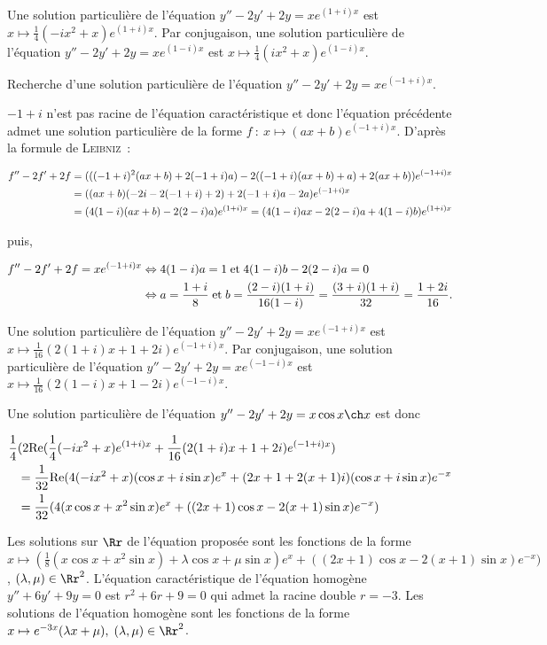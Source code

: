 {{Une solution particulière de l'équation $y''-2y'+2y=xe^{(1+i)x}$ est $x\mapsto\frac{1}{4}(-ix^2+x)e^{(1+i)x}$. Par
conjugaison, une solution particulière de l'équation $y''-2y'+2y=xe^{(1-i)x}$ est
$x\mapsto\frac{1}{4}(ix^2+x)e^{(1-i)x}$.

Recherche d'une solution particulière de l'équation $y''-2y'+2y=xe^{(-1+i)x}$.

$-1+i$ n'est pas racine de l'équation caractéristique et donc
l'équation précédente admet une solution particulière de la forme $f~:~x\mapsto(ax+b)e^{(-1+i)x}$. D'après la formule
de \textsc{Leibniz}~:

\begin{align*}\ensuremath
f''-2f'+2f&=(((-1+i)^2(ax+b)+2(-1+i)a)-2((-1+i)(ax+b)+a)+2(ax+b))e^{(-1+i)x}\\
 &=((ax+b)(-2i-2(-1+i)+2)+2(-1+i)a-2a)e^{(-1+i)x}\\
 &=(4(1-i)(ax+b)-2(2-i)a)e^{(1+i)x}=(4(1-i)ax-2(2-i)a+4(1-i)b)e^{(1+i)x}
\end{align*}

puis,

\begin{align*}\ensuremath
f''-2f'+2f=xe^{(-1+i)x}&\Leftrightarrow4(1-i)a=1\;\mbox{et}\;4(1-i)b-2(2-i)a=0\\
 &\Leftrightarrow
a=\frac{1+i}{8}\;\mbox{et}\;b=\frac{(2-i)(1+i)}{16(1-i)}=\frac{(3+i)(1+i)}{32}=\frac{1+2i}{16}.
\end{align*}

Une solution particulière de l'équation $y''-2y'+2y=xe^{(-1+i)x}$ est $x\mapsto\frac{1}{16}(2(1+i)x+1+2i)e^{(-1+i)x}$.
Par conjugaison, une solution particulière de l'équation $y''-2y'+2y=xe^{(-1-i)x}$ est
$x\mapsto\frac{1}{16}(2(1-i)x+1-2i)e^{(-1-i)x}$.

Une solution particulière de l'équation $y''-2y'+2y=x\cos x\ch x$ est donc

\begin{align*}\ensuremath
\frac{1}{4}&(2\mbox{Re}(\frac{1}{4}(-ix^2+x)e^{(1+i)x}+\frac{1}{16}(2(1+i)x+1+2i)e^{(-1+i)x})\\
 &=\frac{1}{32}\mbox{Re}(4(-ix^2+x)(\cos x+i\sin x)e^x+(2x+1+2(x+1)i)(\cos x+i\sin x)e^{-x}\\
 &=\frac{1}{32}(4(x\cos x+x^2\sin x)e^x+((2x+1)\cos x-2(x+1)\sin x)e^{-x})
\end{align*}

Les solutions sur $\Rr$ de l'équation proposée sont les fonctions de la forme $x\mapsto(\frac{1}{8}(x\cos x+x^2\sin
x)+\lambda\cos x+\mu\sin x)e^x+((2x+1)\cos x-2(x+1)\sin x)e^{-x})$, $(\lambda,\mu)\in\Rr^2$.
L'équation caractéristique de l'équation homogène $y''+6y'+9y=0$ est $r^2+6r+9=0$ qui admet la racine double
$r=-3$. Les solutions de l'équation homogène sont les fonctions de la forme $x\mapsto
e^{-3x}(\lambda x+\mu),\;(\lambda,\mu)\in\Rr^2$.

}}
